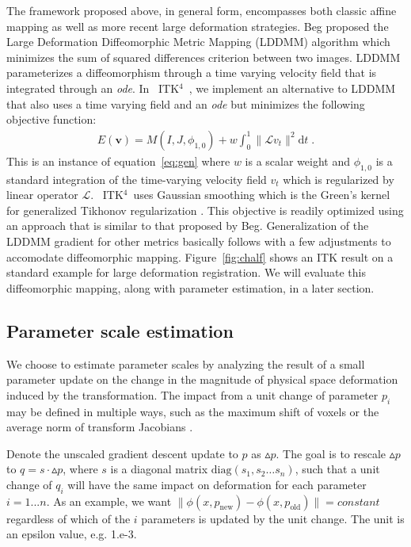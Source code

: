 \documentclass{frontiersSCNS}
\newcommand{\vect}[1]{\mathbf{#1}}
\renewcommand{\v}{\vect{v}}
\newcommand{\myphi}{\phi}
\newcommand{\dd}{\text{d}}
\newcommand{\myE}{E}
\newcommand{\opL}{\mathcal{L}}
\newcommand{\tk}{~ITK$^{\text{4}}$~}
\begin{document}
The framework proposed above, in general form, encompasses both
classic affine mapping as well as more recent large deformation
strategies.  Beg proposed the Large Deformation Diffeomorphic Metric Mapping
(LDDMM) algorithm \cite{Miller2005} which minimizes the sum of squared differences
criterion between two images.  LDDMM parameterizes a
diffeomorphism through a time varying velocity field that is
integrated through an {\em ode}.  In \tk, we implement an alternative
to LDDMM that also uses a time varying field and an {\em ode} but minimizes
the following objective function:
\begin{align}
\myE(\v) = M(I,J,\myphi_{1,0})
+  w \int_{0}^{1} \| \opL v_t\|^2 \dd t \;.
\label{eq:lddmm}
\end{align}
This is an instance of equation~\ref{eq:gen} where $w$ is a scalar
weight and $\myphi_{1,0}$ is a standard integration of the
time-varying velocity field $v_t$ which is regularized by linear
operator $\opL$.  \tk uses Gaussian smoothing which is the Green's
kernel for generalized Tikhonov regularization \cite{Nielsen1997}.
This objective is readily optimized using an approach that is similar
to that proposed by Beg.  Generalization of the LDDMM gradient 
for other metrics basically follows \cite{hermosillo} with a few
adjustments to accomodate diffeomorphic mapping.
Figure~\ref{fig:chalf} shows an ITK result on a standard example for large
deformation registration.  We will evaluate this diffeomorphic
mapping, along with parameter estimation, in a later section.



\subsection{Parameter scale estimation}
We choose to estimate parameter scales by analyzing the result of a
small parameter update on the change in the magnitude of physical space deformation
induced by the transformation.  The impact from a unit change of
parameter $p_i$ may be defined in multiple ways, such as the maximum shift of
voxels or the average norm of transform Jacobians \cite{Jenkinson2001}.

Denote the unscaled gradient descent update to $p$ as $\vartriangle
p$.  The goal is to rescale $\vartriangle p$ to $q = s \cdot \vartriangle p$, where $s$ is a diagonal
matrix $\text{diag} (s_1, s_2 \ldots s_n)$, such that a unit change of $q_i$ will have
the same impact on deformation for each parameter $i = 1... n$.   
As an example, we want $ \| \phi(x,p_{\text{new}}) -
\phi(x,p_\text{old}) \| = constant $ regardless of which of the
$i$ parameters is updated by the unit change.  The unit is an epsilon
value, e.g. 1.e-3.
\end{document}
